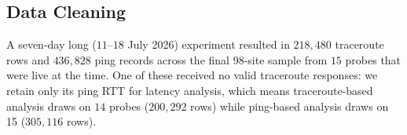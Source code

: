 \documentclass[sigconf,anonymous,10pt]{acmart}
\begin{document}

\subsection{Data Cleaning}
\label{sec:cleaning}
A seven-day long ($11$–$18$ July 2026) experiment resulted in $218,480$ traceroute rows and $436,828$ ping records across the final 98-site sample from $15$ probes that were live at the time. One of these received no valid traceroute responses: we retain only its ping RTT for latency analysis, which means traceroute-based analysis draws on $14$ probes ($200,292$ rows) while ping-based analysis draws on 15 ($305,116$ rows).

\end{document}
